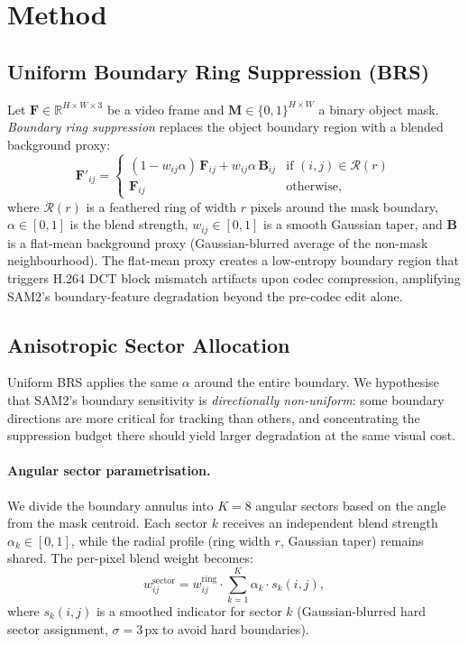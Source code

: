 \section{Method}
\label{sec:method}

\subsection{Uniform Boundary Ring Suppression (BRS)}
\label{subsec:brs}

Let $\mathbf{F} \in \mathbb{R}^{H \times W \times 3}$ be a video frame and $\mathbf{M} \in \{0,1\}^{H \times W}$ a binary object mask.
\emph{Boundary ring suppression} replaces the object boundary region with a blended background proxy:
\begin{equation}
\label{eq:brs}
\mathbf{F}'_{ij} =
\begin{cases}
(1 - w_{ij}\alpha)\,\mathbf{F}_{ij} + w_{ij}\alpha\,\mathbf{B}_{ij} & \text{if } (i,j) \in \mathcal{R}(r) \\
\mathbf{F}_{ij} & \text{otherwise,}
\end{cases}
\end{equation}
where $\mathcal{R}(r)$ is a feathered ring of width $r$ pixels around the mask boundary, $\alpha \in [0,1]$ is the blend strength, $w_{ij} \in [0,1]$ is a smooth Gaussian taper, and $\mathbf{B}$ is a flat-mean background proxy (Gaussian-blurred average of the non-mask neighbourhood).
The flat-mean proxy creates a low-entropy boundary region that triggers H.264 DCT block mismatch artifacts upon codec compression, amplifying SAM2's boundary-feature degradation beyond the pre-codec edit alone.

\subsection{Anisotropic Sector Allocation}
\label{subsec:aniso}

Uniform BRS applies the same $\alpha$ around the entire boundary.
We hypothesise that SAM2's boundary sensitivity is \emph{directionally non-uniform}: some boundary directions are more critical for tracking than others, and concentrating the suppression budget there should yield larger degradation at the same visual cost.

\paragraph{Angular sector parametrisation.}
We divide the boundary annulus into $K{=}8$ angular sectors based on the angle from the mask centroid.
Each sector $k$ receives an independent blend strength $\alpha_k \in [0,1]$, while the radial profile (ring width $r$, Gaussian taper) remains shared.
The per-pixel blend weight becomes:
\begin{equation}
\label{eq:sector}
w^\mathrm{sector}_{ij} = w^\mathrm{ring}_{ij} \cdot \sum_{k=1}^{K} \alpha_k \cdot s_k(i,j),
\end{equation}
where $s_k(i,j)$ is a smoothed indicator for sector $k$ (Gaussian-blurred hard sector assignment, $\sigma{=}3$\,px to avoid hard boundaries).

